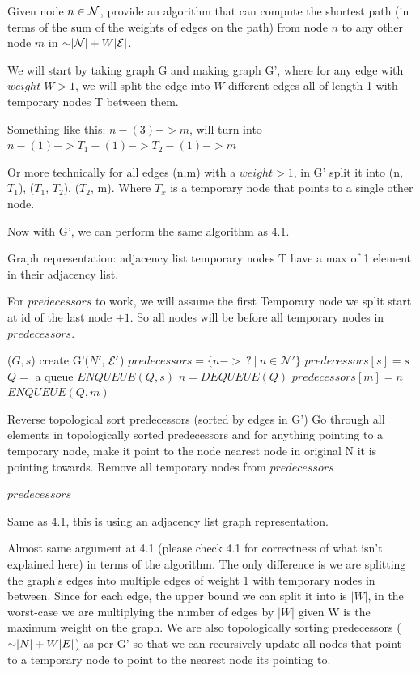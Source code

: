 \begin{problem}
\begin{questions}
\item Given node $n \in \mathcal{N}$, provide an algorithm that can compute the shortest path (in terms of the sum of the weights of edges on the path) from node $n$ to any other node $m$ in $\mathord{\sim}\lvert \mathcal{N} \rvert + W\lvert \mathcal{E} \rvert$.

We will start by taking graph G and making graph G', where for any edge with $weight \; W > 1$, we will split the edge into $W$ different edges all of length 1 with temporary nodes T between them.

Something like this: $n -(3)-> m$, will turn into $n -(1)-> T_1 -(1)-> T_2 -(1)-> m$

Or more technically for all edges (n,m) with a $weight > 1$, in G' split it into (n, $T_1$), ($T_1$, $T_2$), ($T_2$, m).
Where $T_x$ is a temporary node that points to a single other node.

Now with G', we can perform the same algorithm as 4.1.

Graph representation: adjacency list temporary nodes T have a max of 1 element in their adjacency list.

For $predecessors$ to work, we will assume the first Temporary node we split start at id of the last node $+ 1$.
So all nodes will be before all temporary nodes in $predecessors$.

\begin{myalgo}{($G, s$)}
  \STATE create G'($N'$, $\mathcal{E}'$)
  \STATE $predecessors = \{n -> \:? \:|\: n \in \mathcal{N'}\}$
  \STATE $predecessors[s] = s$
  \STATE $Q =$ a queue
  \STATE $ENQUEUE(Q, s)$
    \STATE $n = DEQUEUE(Q)$
        \STATE $predecessors[m] = n$
        \STATE $ENQUEUE(Q, m)$
      \ENDIF
    \ENDFOR
  \ENDWHILE

  \STATE Reverse topological sort predecessors (sorted by edges in G')
  \STATE Go through all elements in topologically sorted predecessors and for anything pointing to a temporary node, make it point to the node nearest node in original N it is pointing towards.
  \STATE Remove all temporary nodes from $predecessors$

  \RETURN $predecessors$
\end{myalgo}

Same as 4.1, this is using an adjacency list graph representation.

Almost same argument at 4.1 (please check 4.1 for correctness of what isn't explained here) in terms of the algorithm. The only difference is we are splitting the graph's edges into multiple edges of weight 1 with temporary nodes in between. Since for each edge, the upper bound we can split it into is $|W|$, in the worst-case we are multiplying the number of edges by $|W|$ given W is the maximum weight on the graph. 
We are also topologically sorting predecessors ($\mathord{\sim}|N| + W|E|$) as per G' so that we can recursively update all nodes that point to a temporary node to point to the nearest node its pointing to.


\end{questions}
\end{problem}
